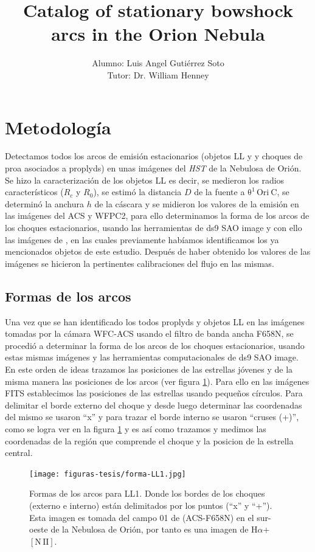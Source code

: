 \documentclass{article}
\title{Catalog of stationary bowshock arcs in the Orion Nebula}
\author{
  Alumno: Luis Angel Gutiérrez Soto\\
  Tutor: Dr. William Henney
}
\newcommand\thC{\ensuremath{\mathrm{\theta^1\,Ori~C}}}
\newcommand\ha{\ensuremath{\mathrm{H}\alpha}}
\newcommand\nii{\ensuremath{\mathrm{[N\,II]}}}
\begin{document}
\maketitle

\section{Metodología}
\label{sec:metodologia}
Detectamos todos los arcos de emisión estacionarios (objetos LL y y choques de proa asociados a proplyds) en unas imágenes del \textit{HST} de la Nebulosa de Orión. Se hizo la caracterización de los objetos LL es decir, se medieron los radios característicos (\(R_{c}\) y \( R_{0}\)), se estimó  la distancia \(D\) de la fuente a \thC{}, se determinó la anchura \(h\) de la cáscara y se  midieron  los valores de la emisión en las imágenes del ACS y WFPC2, para ello determinamos la forma de los arcos de los choques estacionarios, usando las herramientas de ds9 SAO image y con ello las imágenes de \citet{Bally:2006a}, en las cuales previamente habíamos identificamos los ya mencionados objetos de este estudio. Después de haber obtenido los valores de las imágenes se hicieron la pertinentes calibraciones del flujo en las mismas.

\subsection{Formas de los arcos}
\label{sec:arcos}

Una vez que se han identificado los todos proplyds y objetos LL en las imágenes tomadas por la cámara WFC-ACS usando el filtro de banda ancha F658N, se procedió a determinar la forma de los arcos de los choques estacionarios, usando estas mismas imágenes y las herramientas computacionales de ds9 SAO image. En este orden de ideas trazamos las posiciones de las estrellas jóvenes y de la misma manera las posiciones de los arcos (ver figura \ref{fig:arco-LL1}). Para ello en las imágenes FITS  establecimos las posiciones de las estrellas usando pequeños círculos. Para delimitar el borde externo del choque y desde luego determinar las coordenadas del mismo se usaron ``x'' y  para trazar el borde interno se usaron ``cruses (+)'', como se logra ver en la figura \ref{fig:arco-LL1} y es así como trazamos y medimos las coordenadas de la  región que comprende el choque y la posicion de la estrella central. 

\begin{figure}
  \centering
   \texttt{[image: figuras-tesis/forma-LL1.jpg]}
  \caption{Formas de los arcos para LL1. Donde los bordes de los choques (externo e interno) están delimitados por los puntos (``x'' y ``+''). Esta imagen es tomada del campo 01 de \citet{Bally:2006a} (ACS-F658N) en el sur-oeste de la Nebulosa de Orión, por tanto es una imagen de \ha{}+\nii{}. }
  \label{fig:arco-LL1}
\end{figure}
\end{document}
